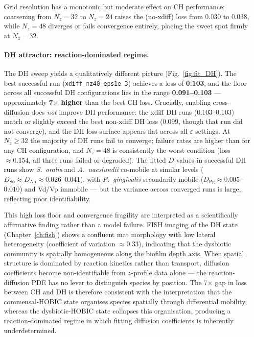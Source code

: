 Grid resolution has a monotonic but moderate effect on CH performance: coarsening
from $N_z = 32$ to $N_z = 24$ raises the (no-xdiff) loss from $0.030$ to $0.038$,
while $N_z = 48$ diverges or fails convergence entirely, placing the sweet spot
firmly at $N_z = 32$.

\paragraph{DH attractor: reaction-dominated regime.}
The DH sweep yields a qualitatively different picture (Fig.~\ref{fig:fit_DH}).
The best successful run (\texttt{xdiff\_nz40\_eps1e-3}) achieves a loss of
\textbf{0.103}, and the floor across all successful DH configurations lies in the
range \textbf{0.091--0.103} — approximately \textbf{7$\times$ higher} than the
best CH loss.
Crucially, enabling cross-diffusion does \emph{not} improve DH performance:
the xdiff DH runs (0.103--0.103) match or slightly exceed the best non-xdiff DH
loss (0.099, though that run did not converge), and the DH loss surface appears
flat across all $\varepsilon$ settings.
At $N_z \geq 32$ the majority of DH runs fail to converge; failure rates are
higher than for any CH configuration, and $N_z = 48$ is consistently the worst
condition (loss $\approx 0.154$, all three runs failed or degraded).
The fitted $D$ values in successful DH runs show \textit{S.~oralis} and
\textit{A.~naeslundii} co-mobile at similar levels
($D_{\mathrm{So}} \approx D_{\mathrm{An}} \approx 0.026$--$0.041$), with
\textit{P.~gingivalis} secondarily mobile ($D_{\mathrm{Pg}} \approx 0.005$--$0.010$)
and Vd/Vp immobile — but the variance across converged runs is large, reflecting
poor identifiability.

This high loss floor and convergence fragility are interpreted as a scientifically
affirmative finding rather than a model failure.
FISH imaging of the DH state (Chapter~\ref{ch:fish}) shows a confluent mat
morphology with low lateral heterogeneity (coefficient of variation $\approx 0.33$),
indicating that the dysbiotic community is spatially homogeneous along the biofilm
depth axis.
When spatial structure is dominated by reaction kinetics rather than transport,
diffusion coefficients become non-identifiable from $z$-profile data alone — the
reaction-diffusion PDE has no lever to distinguish species by position.
The 7$\times$ gap in loss between CH and DH is therefore consistent with the
interpretation that the commensal-HOBIC state organises species spatially through
differential mobility, whereas the dysbiotic-HOBIC state collapses this
organisation, producing a reaction-dominated regime in which fitting diffusion
coefficients is inherently underdetermined.

